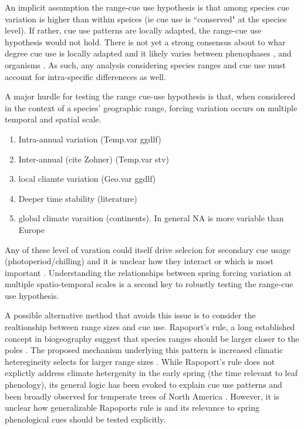 \documentclass[11pt]{article}\usepackage[]{graphicx}\usepackage[]{color}
\begin{document}
An implicit assumption the range-cue use hypothesis is that among species cue variation is higher than within speices (ie cue use is ``conserved" at the species level). If rather, cue use patterns are locally adapted, the range-cue use hypothesis would not hold. There is not yet a strong consensus about to whar degree cue use is locally adapted and it likely varies between phenophases \citep{}, and organisms \citep{}. As such, any analysis considering species ranges and cue use must account for intra-specific differeneces as well.

A major hurdle for testing the range cue-use hypothesis is that, when considered in the context of a species' geographic range, forcing variation occurs on multiple temporal and spatial scale.
\begin{enumerate}
\item Intra-annual variation (Temp.var ggdlf)
\item Inter-annual (cite Zohner) (Temp.var stv)
\item local cliamte variation (Geo.var ggdlf)
\item Deeper time stability \citep{} (literature)
\item global climate varaition (continents). In general NA is more variable than Europe
\end{enumerate}

 Any of these level of varation could itself drive selecion for secondary cue usage (photoperiod/chilling) and it is unclear how they interact or which is most important \citep{Zagmajster:2014aa}. Understanding the relationships between spring forcing variation at multiple spatio-temporal scales is a second key to robustly testing the range-cue use hypothesis.

A possible alternative method that avoids this issue is to consider the realtionship between range sizes and cue use. Rapoport's rule, a long established concept in biogeography suggest that species ranges should be larger closer to the poles \citep{}. The proposed mechanism underlying this pattern is increased climatic heteregineity selects for larger range sizes \citep{}. While Rapoport's rule does not explictly address climate hetergenity in the early spring (the time relevant to leaf phenology), its general logic has been evoked to explain cue use patterns \citep{} and been broadly observed for temperate trees of North America \citep{}. However, it is unclear how generalizable Rapoports rule is \citep{Gaston:1999aa} and its relevance to spring phenological cues should be tested explicitly.\\
\end{document}
